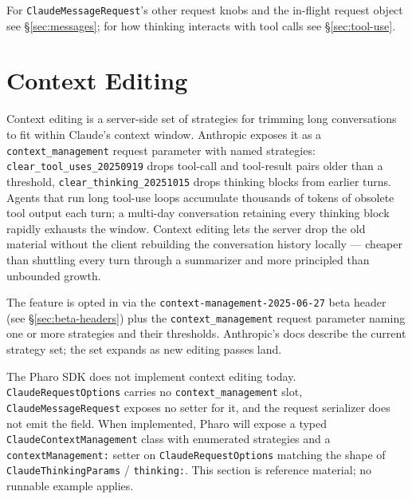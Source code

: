 \documentclass[a4paper,10pt,fleqn]{article}
\begin{document}
For \texttt{ClaudeMessageRequest}'s other request knobs and the
in-flight request object see \S\ref{sec:messages}; for how thinking
interacts with tool calls see \S\ref{sec:tool-use}.

\medskip
\begin{sloppypar}
\end{sloppypar}

\section{Context Editing}
\label{sec:context-editing}

Context editing is a server-side set of strategies for trimming
long conversations to fit within Claude's context window.  Anthropic
exposes it as a \texttt{context\_management} request parameter with
named strategies: \texttt{clear\_tool\_uses\_20250919} drops
tool-call and tool-result pairs older than a threshold,
\texttt{clear\_thinking\_20251015} drops thinking blocks from
earlier turns.  Agents that run long tool-use loops accumulate
thousands of tokens of obsolete tool output each turn; a multi-day
conversation retaining every thinking block rapidly exhausts the
window.  Context editing lets the server drop the old material
without the client rebuilding the conversation history locally ---
cheaper than shuttling every turn through a summarizer and more
principled than unbounded growth.

The feature is opted in via the \texttt{context-management-2025-06-27}
beta header (see \S\ref{sec:beta-headers}) plus the
\texttt{context\_management} request parameter naming one or more
strategies and their thresholds.  Anthropic's docs describe the
current strategy set; the set expands as new editing passes land.

\begin{sloppypar}
The Pharo SDK does not implement context editing today.
\texttt{ClaudeRequestOptions} carries no
\texttt{context\_management} slot, \texttt{ClaudeMessageRequest}
exposes no setter for it, and the request serializer does not emit
the field.  When implemented, Pharo will expose a typed
\texttt{ClaudeContextManagement} class with enumerated strategies
and a \texttt{contextManagement:} setter on
\texttt{ClaudeRequestOptions} matching the shape of
\texttt{ClaudeThinkingParams} / \texttt{thinking:}.  This section
is reference material; no runnable example applies.
\end{sloppypar}
\end{document}
